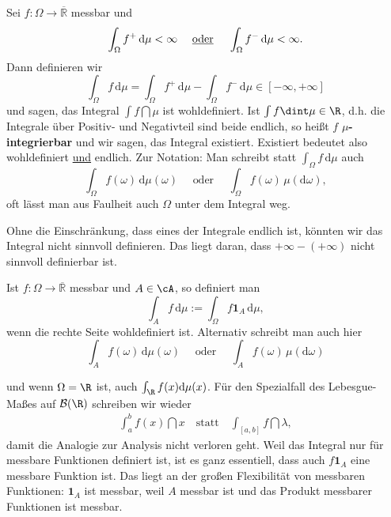 \begin{deff}\label{nnn}
	Sei $f:\Omega\to \overline{\mathbb{R}}$ messbar und \[ \int_{\Omega} f^+ \,\mathrm{d}\mu < \infty\quad \text{ \underline{oder} }\quad\int_{\Omega} f^- \,\mathrm{d}\mu < \infty. \] Dann definieren wir
	\[ \int_{\Omega} f \,\mathrm{d}\mu = \int_{\Omega} f^+ \,\mathrm{d}\mu - \int_{\Omega} f^-\, \mathrm{d}\mu\in [-\infty,+\infty] \]
	und sagen, das Integral $\int f\dint \mu$ ist wohldefiniert. Ist $\int f \dint \mu \in \R$, d.h. die Integrale \"uber Positiv- und Negativteil sind beide endlich, so hei\ss t $f$ \textbf{$\mu$-integrierbar} und wir sagen, das Integral existiert. Existiert bedeutet also wohldefiniert \underline{und} endlich. Zur Notation: Man schreibt statt $\int_{\Omega} f \,\mathrm{d}\mu$ auch
	\[ \int_{\Omega} f(\omega) \,\mathrm{d}\mu(\omega) \quad \text{ oder }\quad
	 \int_{\Omega} f(\omega)\, \mu(\mathrm{d}\omega), \]
	 oft l\"asst man aus Faulheit auch $\Omega$ unter dem Integral weg.
\end{deff}
Ohne die Einschr\"ankung, dass eines der Integrale endlich ist, k\"onnten wir das Integral nicht sinnvoll definieren. Das liegt daran, dass $+\infty-(+\infty)$ nicht sinnvoll definierbar ist. 
\begin{deff}
	Ist $ f \! : \Omega \rightarrow \overline{\mathbb{R}}$ messbar und $A \in \cA$, so definiert man 
	\[ \int_{A} f\, \mathrm{d}\mu := \int_{\Omega} f \mathbf{1}_A\, \mathrm{d}\mu, \]
	wenn die rechte Seite wohldefiniert ist. Alternativ schreibt man auch hier \[ \int_{A} f(\omega)\, \mathrm{d}\mu(\omega) \quad \text{ oder }\quad \int_{A} f(\omega) \,\mu(\mathrm{d}\omega) \]
\end{deff}
und wenn $\Omega=\R$ ist, auch $\int_\R f(x)  \mathrm{d}\mu(x)$.  F\"ur den Spezialfall des Lebesgue-Ma\ss es auf $\mathcal B(\R)$ schreiben wir wieder
\begin{align*}
	\int_a^b f(x)\dint x\quad \text{statt} \quad \int_{[a,b]} f\dint \lambda,
\end{align*}
damit die Analogie zur Analysis nicht verloren geht.
 Weil das Integral nur f\"ur messbare Funktionen definiert ist, ist es ganz essentiell, dass auch $f \mathbf{1}_A$ eine messbare Funktion ist. Das liegt an der gro\ss en Flexibilit\"at von messbaren Funktionen: $\mathbf{1}_A$ ist messbar, weil $A$ messbar ist und das Produkt messbarer Funktionen ist messbar.


